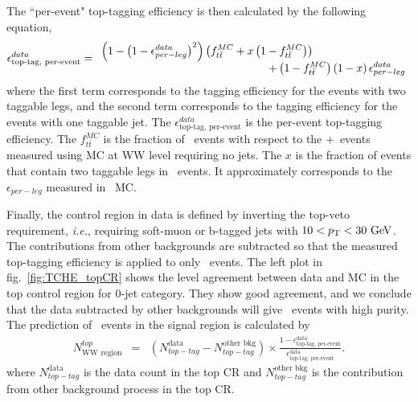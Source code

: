 The ``per-event" top-tagging efficiency is then calculated by the following equation, 
\begin{eqnarray} 
\label{eq:TopTagEff0jet}
\epsilon_{\textrm{top-tag, per-event}}^{data} 
= 
\begin{array}{ccc} \multicolumn{2}{c}{\displaystyle 
\left(1-\left(1-\epsilon_{per-leg}^{data}\right)^2\right) 
\left(f_{t\bar{t}}^{MC} + x\left(1-f_{t\bar{t}}^{MC}\right) \right)
} & \\ & \multicolumn{2}{c}{\hspace{5cm} \displaystyle
+ \left(1-f_{t\bar{t}}^{MC}\right)\left(1-x\right)\epsilon_{per-leg}^{data}
} \end{array}   
\end{eqnarray} 
where the first term corresponds to the tagging efficiency for the events with 
two taggable legs, and the second term corresponds to the tagging efficiency for 
the events with one taggable jet. 
The $\epsilon_{\textrm{top-tag, per-event}}^{data}$ is the per-event top-tagging efficiency. 
The $f_{t\bar{t}}^{MC}$ is the fraction of \ttbar\ events with respect to the 
\ttbar+\tw\ events measured using MC at WW level requiring no jets. 
The $x$ is the fraction of events that contain two taggable legs in \tw\ events. 
It approximately corresponds to the $\epsilon_{per-leg}$ measured in \tw\ MC.  

Finally, the control region in data is defined by inverting the top-veto requirement, 
\textit{i.e.}, requiring soft-muon or b-tagged jets with $10<p_\mathrm{T}<30~\mathrm{Ge\kern -0.1em V}$.
The contributions from other backgrounds are subtracted so that the 
measured top-tagging efficiency is applied to only \topbkg\ events. 
The left plot in fig.~\ref{fig:TCHE_topCR} shows the level agreement between 
data and MC in the top control region for 0-jet category.  
They show good agreement, and we conclude that the data subtracted by other backgrounds 
will give \topbkg\ events with high purity. 
The prediction of \topbkg\ events in the signal region is calculated by 
\begin{eqnarray} 
\label{eq:topExtrapolation0jet}
N^{top}_{\textrm{WW region}}
&=&   
(N_{top-tag}^{\textrm{data}}-N_{top-tag}^{\textrm{other bkg}}) \times
\frac{1-\epsilon_{\textrm{top-tag, per-event}}^{\textrm{data}}}
     {\epsilon_{\textrm{top-tag, per-event}}^{\textrm{data}}}.  
\end{eqnarray} 
where $N_{top-tag}^{\textrm{data}}$ is the data count in the top CR 
and $N_{top-tag}^{\textrm{other bkg}}$ is the contribution from other 
background process in the top CR.

